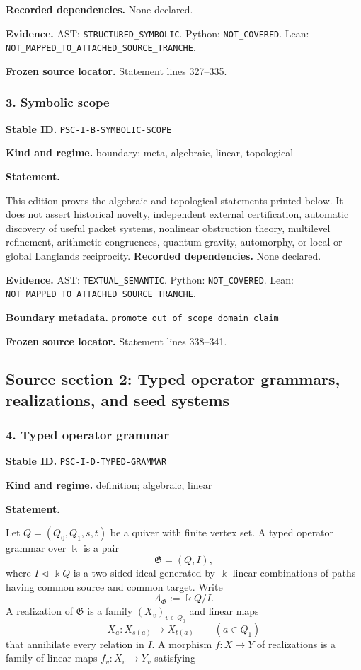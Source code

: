 \documentclass[a4paper,11pt]{article}
\newcommand{\bbk}{\Bbbk}\newcommand{\A}{\mathcal A}\newcommand{\B}{\mathcal B}\newcommand{\Ccal}{\mathcal C}\newcommand{\Pcal}{\mathcal P}\newcommand{\Qcal}{\mathcal Q}\newcommand{\Rcal}{\mathcal R}\newcommand{\Scal}{\mathcal S}
\newcommand{\field}[2]{\noindent\textbf{#1.} #2\par}
\begin{document}
\field{Recorded dependencies}{None declared.}
\field{Evidence}{AST: \nolinkurl{STRUCTURED_SYMBOLIC}. Python: \nolinkurl{NOT_COVERED}. Lean: \nolinkurl{NOT_MAPPED_TO_ATTACHED_SOURCE_TRANCHE}.}
\field{Frozen source locator}{Statement lines 327--335.}
\subsubsection*{3. Symbolic scope}
\label{rec:PSC-I-B-SYMBOLIC-SCOPE}
\field{Stable ID}{\nolinkurl{PSC-I-B-SYMBOLIC-SCOPE}}
\field{Kind and regime}{boundary; meta, algebraic, linear, topological}
\textbf{Statement.}\par
This edition proves the algebraic and topological statements printed below.  It does not assert historical novelty, independent external certification, automatic discovery of useful packet systems, nonlinear obstruction theory, multilevel refinement, arithmetic congruences, quantum gravity, automorphy, or local or global Langlands reciprocity.
\field{Recorded dependencies}{None declared.}
\field{Evidence}{AST: \nolinkurl{TEXTUAL_SEMANTIC}. Python: \nolinkurl{NOT_COVERED}. Lean: \nolinkurl{NOT_MAPPED_TO_ATTACHED_SOURCE_TRANCHE}.}
\field{Boundary metadata}{\nolinkurl{promote_out_of_scope_domain_claim}}
\field{Frozen source locator}{Statement lines 338--341.}
\clearpage\subsection{Source section 2: Typed operator grammars, realizations, and seed systems}
\subsubsection*{4. Typed operator grammar}
\label{rec:PSC-I-D-TYPED-GRAMMAR}
\field{Stable ID}{\nolinkurl{PSC-I-D-TYPED-GRAMMAR}}
\field{Kind and regime}{definition; algebraic, linear}
\textbf{Statement.}\par
Let $Q=(Q_0,Q_1,s,t)$ be a quiver with finite vertex set.  A typed operator grammar over $\bbk$ is a pair
\[
\mathfrak G=(Q,I),
\]
where $I\triangleleft \bbk Q$ is a two-sided ideal generated by $\bbk$-linear combinations of paths having common source and common target.  Write
\[
\Lambda_{\mathfrak G}:=\bbk Q/I.
\]
A realization of $\mathfrak G$ is a family $(X_v)_{v\in Q_0}$ and linear maps
\[
X_a:X_{s(a)}\longrightarrow X_{t(a)}
\qquad(a\in Q_1)
\]
that annihilate every relation in $I$.  A morphism $f:X\to Y$ of realizations is a family of linear maps $f_v:X_v\to Y_v$ satisfying
\end{document}
